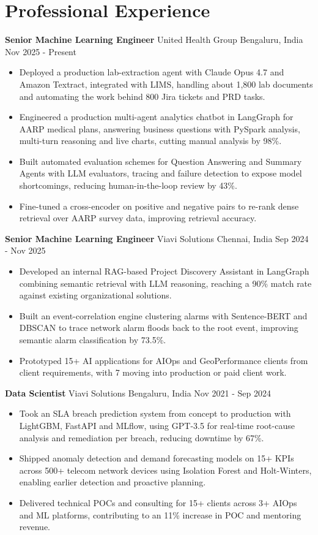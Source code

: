 \documentclass[10pt,a4paper]{article}
\newcommand{\role}[4]{\textbf{#1} \textbar{} #2 \hfill #3 \textbar{} #4\par}
\begin{document}
\section{Professional Experience}
\role{Senior Machine Learning Engineer}{United Health Group}{Bengaluru, India}{Nov 2025 - Present}
\begin{itemize}
  \item Deployed a production lab-extraction agent with Claude Opus 4.7 and Amazon Textract, integrated with LIMS, handling about 1,800 lab documents and automating the work behind 800 Jira tickets and PRD tasks.
  \item Engineered a production multi-agent analytics chatbot in LangGraph for AARP medical plans, answering business questions with PySpark analysis, multi-turn reasoning and live charts, cutting manual analysis by 98\%.
  \item Built automated evaluation schemes for Question Answering and Summary Agents with LLM evaluators, tracing and failure detection to expose model shortcomings, reducing human-in-the-loop review by 43\%.
  \item Fine-tuned a cross-encoder on positive and negative pairs to re-rank dense retrieval over AARP survey data, improving retrieval accuracy.
\end{itemize}
\vspace{3pt}
\role{Senior Machine Learning Engineer}{Viavi Solutions}{Chennai, India}{Sep 2024 - Nov 2025}
\begin{itemize}
  \item Developed an internal RAG-based Project Discovery Assistant in LangGraph combining semantic retrieval with LLM reasoning, reaching a 90\% match rate against existing organizational solutions.
  \item Built an event-correlation engine clustering alarms with Sentence-BERT and DBSCAN to trace network alarm floods back to the root event, improving semantic alarm classification by 73.5\%.
  \item Prototyped 15+ AI applications for AIOps and GeoPerformance clients from client requirements, with 7 moving into production or paid client work.
\end{itemize}
\vspace{3pt}
\role{Data Scientist}{Viavi Solutions}{Bengaluru, India}{Nov 2021 - Sep 2024}
\begin{itemize}
  \item Took an SLA breach prediction system from concept to production with LightGBM, FastAPI and MLflow, using GPT-3.5 for real-time root-cause analysis and remediation per breach, reducing downtime by 67\%.
  \item Shipped anomaly detection and demand forecasting models on 15+ KPIs across 500+ telecom network devices using Isolation Forest and Holt-Winters, enabling earlier detection and proactive planning.
  \item Delivered technical POCs and consulting for 15+ clients across 3+ AIOps and ML platforms, contributing to an 11\% increase in POC and mentoring revenue.
\end{itemize}
\end{document}
